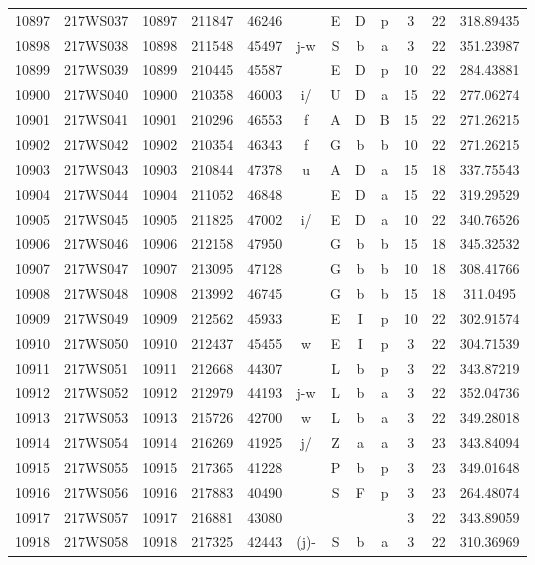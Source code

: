 \begin{tabular}{|*{12}{c|}}
10897 & 217WS037 & 10897 & 211847 & 46246 &  & E & D & p & 3 & 22 & 318.89435 \\ 
10898 & 217WS038 & 10898 & 211548 & 45497 & j-w & S & b & a & 3 & 22 & 351.23987 \\ 
10899 & 217WS039 & 10899 & 210445 & 45587 &  & E & D & p & 10 & 22 & 284.43881 \\ 
10900 & 217WS040 & 10900 & 210358 & 46003 & i/ & U & D & a & 15 & 22 & 277.06274 \\ 
10901 & 217WS041 & 10901 & 210296 & 46553 & f & A & D & B & 15 & 22 & 271.26215 \\ 
10902 & 217WS042 & 10902 & 210354 & 46343 & f & G & b & b & 10 & 22 & 271.26215 \\ 
10903 & 217WS043 & 10903 & 210844 & 47378 & u & A & D & a & 15 & 18 & 337.75543 \\ 
10904 & 217WS044 & 10904 & 211052 & 46848 &  & E & D & a & 15 & 22 & 319.29529 \\ 
10905 & 217WS045 & 10905 & 211825 & 47002 & i/ & E & D & a & 10 & 22 & 340.76526 \\ 
10906 & 217WS046 & 10906 & 212158 & 47950 &  & G & b & b & 15 & 18 & 345.32532 \\ 
10907 & 217WS047 & 10907 & 213095 & 47128 &  & G & b & b & 10 & 18 & 308.41766 \\ 
10908 & 217WS048 & 10908 & 213992 & 46745 &  & G & b & b & 15 & 18 & 311.0495 \\ 
10909 & 217WS049 & 10909 & 212562 & 45933 &  & E & I & p & 10 & 22 & 302.91574 \\ 
10910 & 217WS050 & 10910 & 212437 & 45455 & w & E & I & p & 3 & 22 & 304.71539 \\ 
10911 & 217WS051 & 10911 & 212668 & 44307 &  & L & b & p & 3 & 22 & 343.87219 \\ 
10912 & 217WS052 & 10912 & 212979 & 44193 & j-w & L & b & a & 3 & 22 & 352.04736 \\ 
10913 & 217WS053 & 10913 & 215726 & 42700 & w & L & b & a & 3 & 22 & 349.28018 \\ 
10914 & 217WS054 & 10914 & 216269 & 41925 & j/ & Z & a & a & 3 & 23 & 343.84094 \\ 
10915 & 217WS055 & 10915 & 217365 & 41228 &  & P & b & p & 3 & 23 & 349.01648 \\ 
10916 & 217WS056 & 10916 & 217883 & 40490 &  & S & F & p & 3 & 23 & 264.48074 \\ 
10917 & 217WS057 & 10917 & 216881 & 43080 &  &  &  &  & 3 & 22 & 343.89059 \\ 
10918 & 217WS058 & 10918 & 217325 & 42443 & (j)- & S & b & a & 3 & 22 & 310.36969 \\ 

\end{tabular}

